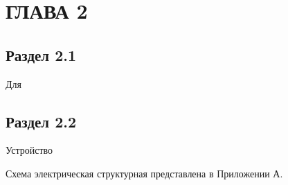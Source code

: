 \chapter[Глава 2]{ГЛАВА 2}

\section{Раздел 2.1}
Для

\section{Раздел 2.2}
Устройство

Схема электрическая структурная представлена в Приложении А.